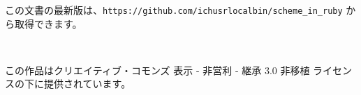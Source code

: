 



この文書の最新版は、\verb|https://github.com/ichusrlocalbin/scheme_in_ruby| から取得できます。

{\Huge \ccbyncsa} \\
\begin{flushright}
\vspace*{-2em}
この作品はクリエイティブ・コモンズ 表示 - 非営利 - 継承 3.0 非移植 ライセンスの下に提供されています。
\end{flushright}
\pagebreak




